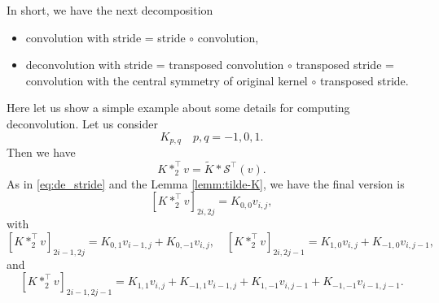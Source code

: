 In short, we have the next decomposition
\begin{itemize}
	\item convolution with stride = stride $ \circ$ convolution,
	\item deconvolution with stride  = transposed convolution $\circ$ transposed stride = convolution with the central symmetry of original kernel $\circ$ transposed stride.
\end{itemize}

\begin{theorem}\label{thm:deconv_op}
Here let us show a simple example about some details for computing deconvolution. 
Let us consider 
\begin{equation}
K_{p,q} \quad p,q = -1, 0, 1.
\end{equation}
Then we have 
$$
K \ast_2^\top v = \tilde K \ast \mathcal S^\top (v).
$$
As in \eqref{eq:de_stride} and the Lemma \ref{lemm:tilde-K}, we have the 
final version is 
\begin{equation}
\label{eq:7}
[K \ast_2^\top v ]_{2i,2j}=  K_{0,0}v_{i,j},
\end{equation}
with 
\begin{equation}
\label{eq:9}
[K \ast_2^\top v ]_{2i-1, 2j} = K_{0,1}v_{i-1,j} + K_{0,-1}v_{i,j}, \quad 
[K \ast_2^\top v ]_{2i, 2j-1} = K_{1,0}v_{i,j} + K_{-1,0}v_{i,j-1},
\end{equation}
and
\begin{equation}
[K \ast_2^\top v ]_{2i-1, 2j-1}  =  
K_{1,1}v_{i,j} + K_{-1,1}v_{i-1,j} + K_{1,-1}v_{i,j-1} + K_{-1,-1}v_{i-1,j-1}.
\end{equation}


\end{theorem}